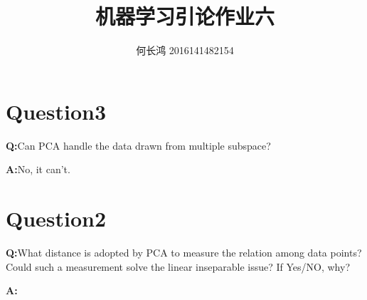 \documentclass{xcumcmart}
\title{机器学习引论作业六}
\author{何长鸿 2016141482154}
\begin{document}
\renewcommand\arraystretch{2}
\maketitle
\section{Question3}
\textbf{Q:}Can PCA handle the data drawn from multiple subspace?\\
\par \textbf{A:}No, it can't.

\section{Question2}
\textbf{Q:}What distance is adopted by PCA to measure the relation among data points? Could such a measurement solve the linear inseparable issue? If Yes/NO, why?\\
\par \textbf{A:}
\end{document}
